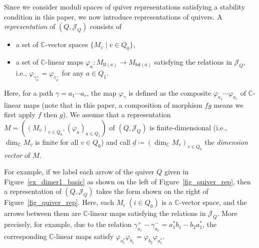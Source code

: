 \documentclass[10pt,a4paper]{amsart}
\numberwithin{equation}{section}
\theoremstyle{definition}
\newcommand{\CC}{\mathbb{C}}
\newcommand{\calJ}{\mathcal{J}}
\newcommand{\hd}{\mathsf{hd}}
\newcommand{\tl}{\mathsf{tl}}
\newcommand{\dd}{\underline{d}}
\begin{document}
Since we consider moduli spaces of quiver representations satisfying a stability condition in this paper,
we now introduce representations of quivers.
A \emph{representation} of $(Q,\calJ_Q)$ consists of
\begin{itemize}\itemsep=0pt
\item a set of $\CC$-vector spaces $\{M_v \mid v\in Q_0\}$,
\item a set of $\CC$-linear maps $\varphi_a\colon M_{\tl(a)}\rightarrow M_{\hd(a)}$ satisfying the relations in $\calJ_Q$,
i.e., $\varphi_{\gamma_a^+}=\varphi_{\gamma_a^-}$ for any $a\in Q_1$.
\end{itemize}
\noindent
Here, for a path $\gamma=a_1\cdots a_r$, the map $\varphi_\gamma$ is defined as the composite $\varphi_{a_1}\cdots\varphi_{a_r}$ of $\CC$-linear maps
(note that in this paper, a composition of morphism $fg$ means we first apply $f$ then $g$).
We assume that a representation $M=((M_v)_{v\in Q_0}, (\varphi_a)_{a\in Q_1})$ of $(Q,\calJ_Q)$ is finite-dimensional
(i.e., $\dim_\CC M_v$ is finite for all $v\in Q_0$) and call ${\dd}\coloneqq(\dim_\CC M_v)_{v\in Q_0}$ the \emph{dimension vector} of $M$.

For example, if we label each arrow of the quiver $Q$ given in Figure~\ref{ex_dimer1_basic} as shown on the left of Figure~\ref{fig_quiver_rep},
then a representation of $(Q,\calJ_Q)$ takes the form shown on the right of Figure~\ref{fig_quiver_rep}.
Here, each $M_i$ $(i\in Q_0)$ is a $\CC$-vector space, and the arrows between them are $\CC$-linear maps satisfying the relations in $\calJ_Q$.
More precisely, for example, due to the relation $\gamma_{a_1}^+-\gamma_{a_1}^-=a_1^*b_1-b_2a_1^*$,
the corresponding $\CC$-linear maps satisfy $\varphi_{a_1^*}\varphi_{b_1}=\varphi_{b_2}\varphi_{a_1^*}$.
\end{document}
